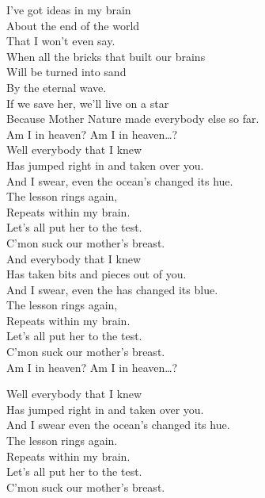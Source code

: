 



I've got ideas in my brain \\
About the end of the world \\
That I won't even say. \\
When all the bricks that built our brains \\
Will be turned into sand \\
By the eternal wave. \\

If we save her, we'll live on a star \\
Because Mother Nature made everybody else so far. \\

Am I in heaven? Am I in heaven…? \\

Well everybody that I knew \\
Has jumped right in and taken over you. \\
And I swear, even the ocean's changed its hue. \\
The lesson rings again, \\
Repeats within my brain. \\
Let's all put her to the test. \\
C'mon suck our mother's breast. \\

And everybody that I knew \\
Has taken bits and pieces out of you. \\
And I swear, even the  has changed its blue. \\
The lesson rings again, \\
Repeats within my brain. \\
Let's all put her to the test. \\
C'mon suck our mother's breast. \\

Am I in heaven? Am I in heaven…?

Well everybody that I knew \\
Has jumped right in and taken over you. \\
And I swear even the ocean's changed its hue. \\
The lesson rings again. \\
Repeats within my brain. \\
Let's all put her to the test. \\
C'mon suck our mother's breast. \\

